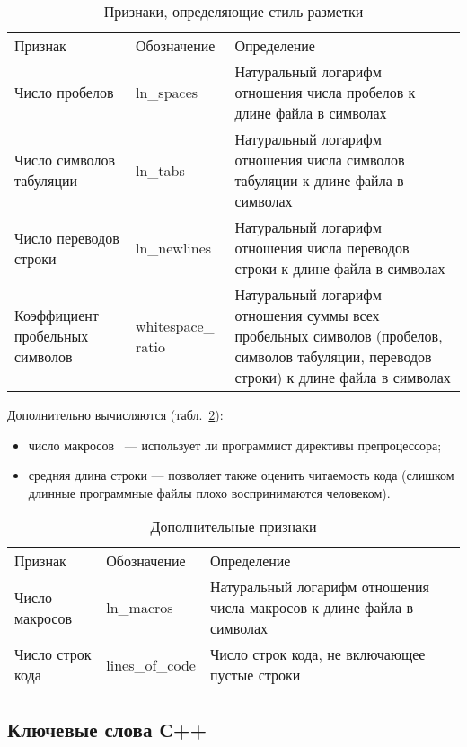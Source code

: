\begin{table}[ht!]
\caption{ Признаки, определяющие стиль разметки }
\label{tab:lex_2}
\begin{center}
\begin{tabularx}{\linewidth}{|>{\hsize=0.23\hsize}X|>{\hsize=0.17\hsize}X|>{\hsize=0.6\hsize}X|}
\hline
\multicolumn{3}{|c|}{Стиль разметки}\\
\hline
Признак & Обозначение & Определение \\
\hline
Число пробелов & ln\_spaces & Натуральный логарифм отношения числа пробелов к длине
файла в символах\\
\hline
Число символов табуляции & ln\_tabs& Натуральный логарифм отношения числа символов табуляции к длине файла в символах\\
\hline
Число переводов строки & ln\_newlines & Натуральный логарифм отношения числа переводов строки
к длине файла в символах\\
\hline
Коэффициент пробельных символов & whitespace\_ ratio& Натуральный логарифм отношения 
суммы всех пробельных символов (пробелов, символов табуляции, переводов строки)
к длине файла в символах\\
\hline
\end{tabularx}
\end{center}
\end{table}


Дополнительно вычисляются (табл.~\ref{tab:lex_4}):
\begin{itemize}
 \item число макросов~\cite{macros} --- использует ли программист директивы препроцессора;
 \item средняя длина строки --- позволяет также оценить читаемость кода (слишком длинные программные файлы
 плохо воспринимаются человеком).
\end{itemize}


\begin{table}[ht!]
\caption{ Дополнительные признаки}
\label{tab:lex_4}
\begin{center}
\begin{tabularx}{\linewidth}{|>{\hsize=0.23\hsize}X|>{\hsize=0.17\hsize}X|>{\hsize=0.6\hsize}X|}
\hline
\multicolumn{3}{|c|}{Дополнительные признаки}\\
\hline
Признак & Обозначение & Определение \\
\hline
Число макросов & ln\_macros & Натуральный логарифм отношения числа макросов к длине файла в символах\\
\hline
Число строк кода & lines\_of\_code & Число строк кода, не включающее пустые строки\\
\hline
\end{tabularx}
\end{center}
\end{table}

\clearpage
\subsection{Ключевые слова С++}\label{keycpp}
